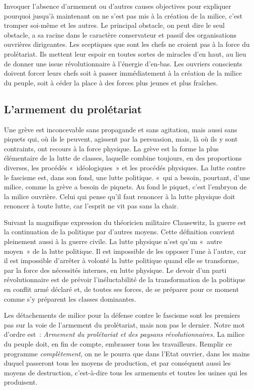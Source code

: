 \documentclass[french,twoside]{book} %
\begin{document}
Invoquer l’absence d’armement ou d’autres causes objectives pour expliquer pourquoi jusqu’à maintenant on ne s’est pas mis à la création de la milice, c’est tromper soi-même et les autres. Le principal obstacle, on peut dire le seul obstacle, a sa racine dans le caractère conservateur et passif des organisations ouvrières dirigeantes. Les sceptiques que sont les chefs ne croient pas à la force du prolétariat. Ils mettent leur espoir en toutes sortes de miracles d’en haut, au lieu de donner une issue révolutionnaire à l’énergie d’en-bas. Les ouvriers conscients doivent forcer leurs chefs soit à passer immédiatement à la création de la milice du peuple, soit à céder la place à des forces plus jeunes et plus fraîches.
\subsection[{L’armement du prolétariat}]{L’armement du prolétariat}
\noindent Une grève est inconcevable sans propagande et sans agitation, mais aussi sans piquets qui, où ils le peuvent, agissent par la persuasion, mais, là où ils y sont contraints, ont recours à la force physique. La grève est la forme la plus élémentaire de la lutte de classes, laquelle combine toujours, en des proportions diverses, les procédés « idéologiques » et les procédés physiques. La lutte contre le fascisme est, dans son fond, une lutte politique.  « qui a besoin, pourtant, d’une milice, comme la grève a besoin de piquets. Au fond le piquet, c’est l’embryon de la milice ouvrière. Celui qui pense qu’il faut renoncer à la lutte physique doit renoncer à toute lutte, car l’esprit ne vit pas sans la chair.\par
Suivant la magnifique expression du théoricien militaire Clausewitz, la guerre est la continuation de la politique par d’autres moyens. Cette définition convient pleinement aussi à la guerre civile. La lutte physique n’est qu’un « autre moyen » de la lutte politique. Il est impossible de les opposer l’une à l’autre, car il est impossible d’arrêter à volonté la lutte politique quand elle se transforme, par la force des nécessités internes, en lutte physique. Le devoir d’un parti révolutionnaire est de prévoir l’inéluctabilité de la transformation de la politique en conflit armé déclaré et, de toutes ses forces, de se préparer pour ce moment comme s’y préparent les classes dominantes.\par
Les détachements de milice pour la défense contre le fascisme sont les premiers pas sur la voie de l’armement du prolétariat, mais non pas le dernier. Notre mot d’ordre est : \emph{Armement du prolétariat et des paysans révolutionnaires.} La milice du peuple doit, en fin de compte, embrasser tous les travailleurs. Remplir ce programme \emph{complètement}, on ne le pourra que dans l’Etat ouvrier, dans les mains duquel passeront tous les moyens de production, et par conséquent aussi les moyens de destruction, c’est-à-dire tous les armements et toutes les usines qui les produisent.\par
\end{document}
